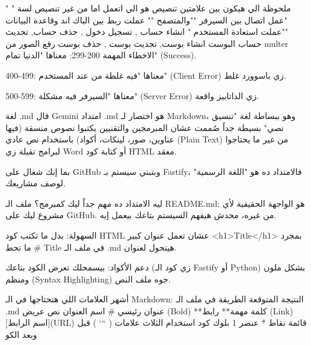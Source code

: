 " 
 ملحوظة الي هيكون بين علامتين تنصيص هو الي اتعمل اما من غير تنصيص لسة
 "
"عمل اتصال بين السيرفر ""والمتصفح ""
 عملت ربط بين الباك اند وقاعدة البيانات
 ""عملت استعادة المستخدم "
 {
    انشاء حساب ,
    تسجيل دخول ,
    حذف حساب,
    تحديث حساب 
 }
 البوست{
    انشاء بوست,
    تجديث بوست ,
    حذف بوست
 }
 رفع الصور من multer
  الاخطاء المهمة
  200-299: معناها "الدنيا تمام" (Success).

400-499: معناها "فيه غلطة من عند المستخدم" (Client Error) زي باسوورد غلط.

500-599: معناها "السيرفر فيه مشكلة" (Server Error) زي الداتابيز واقعة.






لغة .md
قال Gemini
امتداد .md هو اختصار لـ Markdown، وهو ببساطة لغة "تنسيق نصي" بسيطة جداً صُممت عشان المبرمجين والتقنيين يكتبوا نصوص منسقة (فيها عناوين، صور، لينكات، أكواد) باستخدام نص عادي (Plain Text) من غير ما يحتاجوا لبرامج تقيلة زي Word أو كتابة كود HTML معقد.

بما إنك شغال على GitHub وبتبني سيستم بـ Fastify، فالامتداد ده هو "اللغة الرسمية" لوصف مشاريعك.

ليه الامتداد ده مهم جداً ليك كمبرمج؟
ملف الـ README.md: هو الواجهة الحقيقية لأي مشروع ليك على GitHub. من غيره، محدش هيفهم السيستم بتاعك بيعمل إيه.

السهولة: بدل ما تكتب كود HTML عشان تعمل عنوان كبير <h1>Title</h1> بمجرد ما تحط # Title في ملف الـ .md هيتحول لعنوان.

دعم الأكواد: بيسمحلك تعرض الكود بتاعك (زي كود الـ Fastify أو Python) بشكل ملون ومنظم (Syntax Highlighting) جوه ملف النص.

أشهر العلامات اللي هتحتاجها في الـ Markdown:
النتيجة المتوقعة	الطريقة في ملف الـ .md
عنوان رئيسي	# اسم العنوان
نص عريض (Bold)	**كلمة مهمة**
رابط (Link)	[اسم الرابط](URL)
قائمة نقاط	* عنصر 1
بلوك كود	استخدام الثلاث علامات ( ``` ) قبل وبعد الكو